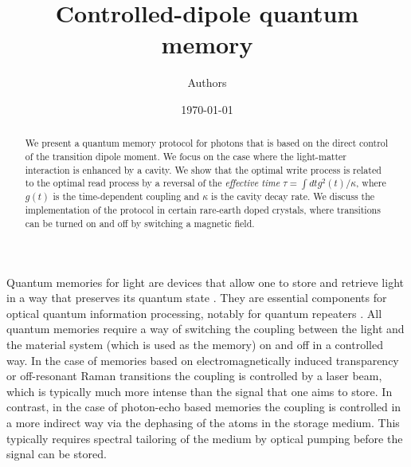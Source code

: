 \documentclass[aps,prl,twocolumn]{revtex4}
\begin{document}
\title{Controlled-dipole quantum memory}

\author{Authors
}


\begin{abstract}
We present a quantum memory protocol for photons that is based on the direct control of the transition dipole moment. We focus on the case where the light-matter interaction is enhanced by a cavity. We show that the optimal write process is related to the optimal read process by a reversal of the {\it effective time} $\tau=\int dt g^2(t)/\kappa$, where $g(t)$ is the time-dependent coupling and $\kappa$ is the cavity decay rate. We discuss the implementation of the protocol in certain rare-earth doped crystals, where transitions can be turned on and off by switching a magnetic field.
\end{abstract}
\date{\today}

\maketitle

Quantum memories for light are devices that allow one to store and retrieve light in a way that preserves its quantum state \cite{lvovsky,hammerer,simonEPJD}. They are essential components for optical quantum information processing, notably for quantum repeaters \cite{sangouardRMP}. All quantum memories require a way of switching the coupling between the light and the material system (which is used as the memory) on and off in a controlled way. In the case of memories based on electromagnetically induced transparency or off-resonant Raman transitions \cite{lukinRMP,gorshkovPRL,EITexp,nunn,Ramanexp} the coupling is controlled by a laser beam, which is typically much more intense than the signal that one aims to store. In contrast, in the case of photon-echo based memories \cite{tittel,echoexp} the coupling is controlled in a more indirect way via the dephasing of the atoms in the storage medium. This typically requires spectral tailoring of the medium by optical pumping before the signal can be stored.
\end{document}
